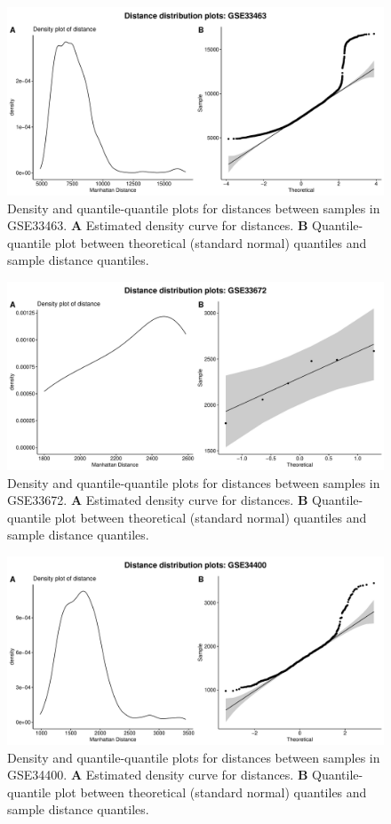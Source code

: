 \documentclass[10pt,letterpaper]{article}\usepackage[]{graphicx}\usepackage[]{color}
\begin{document}
\begin{figure}[H]
	\includegraphics[width=\textwidth]{manhattan-distance_hist_GSE33463.pdf}
	\caption{Density and quantile-quantile plots for distances between samples in GSE33463. \textbf{A} Estimated density curve for distances. \textbf{B} Quantile-quantile plot between theoretical (standard normal) quantiles and sample distance quantiles.}
\end{figure}

\begin{figure}[H]
	\includegraphics[width=\textwidth]{manhattan-distance_hist_GSE33672.pdf}
	\caption{Density and quantile-quantile plots for distances between samples in GSE33672. \textbf{A} Estimated density curve for distances. \textbf{B} Quantile-quantile plot between theoretical (standard normal) quantiles and sample distance quantiles.}
\end{figure}

\begin{figure}[H]
	\includegraphics[width=\textwidth]{manhattan-distance_hist_GSE34400.pdf}
	\caption{Density and quantile-quantile plots for distances between samples in GSE34400. \textbf{A} Estimated density curve for distances. \textbf{B} Quantile-quantile plot between theoretical (standard normal) quantiles and sample distance quantiles.}
\end{figure}
\end{document}
